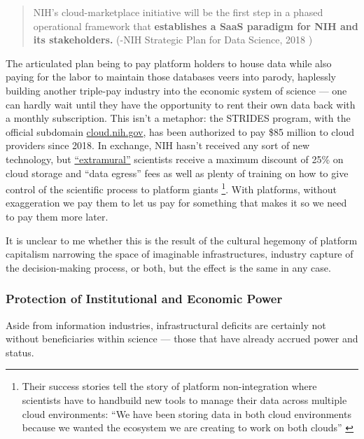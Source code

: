 \documentclass[10pt]{article}
\begin{document}
\begin{multicols}{2}
\begin{quote}
NIH's cloud-marketplace initiative will be the first step in a phased
operational framework that \textbf{establishes a SaaS paradigm for NIH
and its stakeholders.} (-NIH Strategic Plan for Data Science, 2018 \cite{NIHStrategicPlan2018} )
\end{quote}

The articulated plan being to pay platform holders to house data while
also paying for the labor to maintain those databases veers into parody,
haplessly building another triple-pay industry \cite{buranyiStaggeringlyProfitableBusiness2017}  into the economic system
of science --- one can hardly wait until they have the opportunity to
rent their own data back with a monthly subscription. This isn't a
metaphor: the STRIDES program, with the official subdomain
\href{https://web.archive.org/web/20210729131920/https://cloud.nih.gov/}{cloud.nih.gov},
has been authorized to pay \$85 million to cloud providers since 2018.
In exchange, NIH hasn't received any sort of new technology, but
\href{https://web.archive.org/web/20211006003547/https://cloud.nih.gov/enrollment/account-type/}{``extramural''}
scientists receive a maximum discount of 25\% on cloud storage and
``data egress'' fees as well as plenty of training on how to give
control of the scientific process to platform giants \cite{reillyNIHSTRIDESInitiative2021} \footnote{Their success stories tell
  the story of platform non-integration where scientists have to
  handbuild new tools to manage their data across multiple cloud
  environments: ``We have been storing data in both cloud environments
  because we wanted the ecosystem we are creating to work on both
  clouds'' \cite{STRIDESInitiativeSuccess2020} }. With platforms,
without exaggeration we pay them to let us pay for something that makes
it so we need to pay them more later.

It is unclear to me whether this is the result of the cultural hegemony
of platform capitalism narrowing the space of imaginable
infrastructures, industry capture of the decision-making process, or
both, but the effect is the same in any case.

\hypertarget{protection-of-institutional-and-economic-power}{%
\subsubsection{Protection of Institutional and Economic
Power}\label{protection-of-institutional-and-economic-power}}

Aside from information industries, infrastructural deficits are
certainly not without beneficiaries within science --- those that have
already accrued power and status.


\end{multicols}
\end{document}
